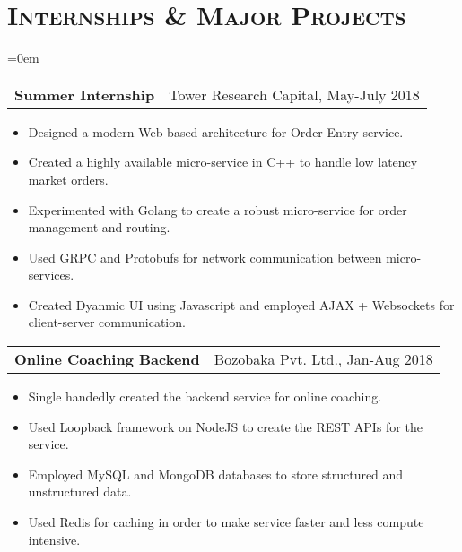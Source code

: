 \documentclass{article}
\makeatletter
\newcommand{\headerrow}[2]
{\begin{tabular*}{\linewidth}{l@{\extracolsep{\fill}}r}
	#1 &
	#2 \\
\end{tabular*}}
\newcommand{\tmpsection}[1]{}
\let\tmpsection=\section
\renewcommand{\section}[1]{\tmpsection*{\textsc{#1}}}
\makeatother
\begin{document}
\section{Internships \& Major Projects}
\begin{list} {}{\leftmargin=0em}
\setlength{\leftmargin}{0pt}

    \item[]
    \headerrow {\textbf{Summer Internship}}{Tower Research Capital, May-July 2018}
    \begin{itemize}
    \setlength\itemsep{0.0em}
	\item Designed a modern Web based architecture for Order Entry service.
	\item Created a highly available micro-service in C++ to handle low latency market orders.
	\item Experimented with Golang to create a robust micro-service for order management and routing.
	\item Used GRPC and Protobufs for network communication between micro-services.
	\item Created Dyanmic UI using Javascript and employed AJAX + Websockets for client-server communication.
    \end{itemize}
    \item[]
    \headerrow {\textbf{Online Coaching Backend}}{Bozobaka Pvt. Ltd., Jan-Aug 2018}
    \begin{itemize}
    \setlength\itemsep{0.0em}
	\item Single handedly created the backend service for online coaching.
	\item Used Loopback framework on NodeJS to create the REST APIs for the service.
	\item Employed MySQL and MongoDB databases to store structured and unstructured data.
	\item Used Redis for caching in order to make service faster and less compute intensive.
    \end{itemize}

\end{list}
\end{document}
